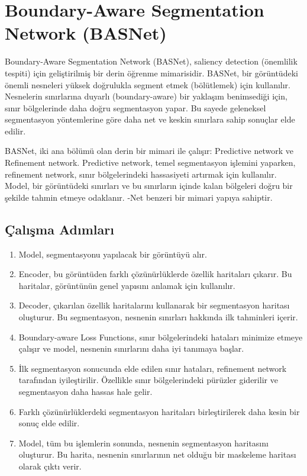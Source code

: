 \section{Boundary-Aware Segmentation Network (BASNet)}

Boundary-Aware Segmentation Network (BASNet), saliency detection (önemlilik tespiti) için geliştirilmiş bir derin öğrenme mimarisidir. BASNet, bir görüntüdeki önemli nesneleri yüksek doğrulukla segment etmek (bölütlemek) için kullanılır. Nesnelerin sınırlarına duyarlı (boundary-aware) bir yaklaşım benimsediği için, sınır bölgelerinde daha doğru segmentasyon yapar. Bu sayede geleneksel segmentasyon yöntemlerine göre daha net ve keskin sınırlara sahip sonuçlar elde edilir.

BASNet, iki ana bölümü olan derin bir mimari ile çalışır: Predictive network ve Refinement network. Predictive network, temel segmentasyon işlemini yaparken, refinement network, sınır bölgelerindeki hassasiyeti artırmak için kullanılır. Model, bir görüntüdeki sınırları ve bu sınırların içinde kalan bölgeleri doğru bir şekilde tahmin etmeye odaklanır. -Net benzeri bir mimari yapıya sahiptir. 

\subsection{Çalışma Adımları}

\begin{enumerate}
    \item Model, segmentasyonu yapılacak bir görüntüyü alır.
    \item Encoder, bu görüntüden farklı çözünürlüklerde özellik haritaları çıkarır. Bu haritalar, görüntünün genel yapısını anlamak için kullanılır.
    \item Decoder, çıkarılan özellik haritalarını kullanarak bir segmentasyon haritası oluşturur. Bu segmentasyon, nesnenin sınırları hakkında ilk tahminleri içerir.
    \item Boundary-aware Loss Functions, sınır bölgelerindeki hataları minimize etmeye çalışır ve model, nesnenin sınırlarını daha iyi tanımaya başlar.
    \item İlk segmentasyon sonucunda elde edilen sınır hataları, refinement network tarafından iyileştirilir. Özellikle sınır bölgelerindeki pürüzler giderilir ve segmentasyon daha hassas hale gelir.
    \item Farklı çözünürlüklerdeki segmentasyon haritaları birleştirilerek daha kesin bir sonuç elde edilir.
    \item Model, tüm bu işlemlerin sonunda, nesnenin segmentasyon haritasını oluşturur. Bu harita, nesnenin sınırlarının net olduğu bir maskeleme haritası olarak çıktı verir.
\end{enumerate}

\newpage